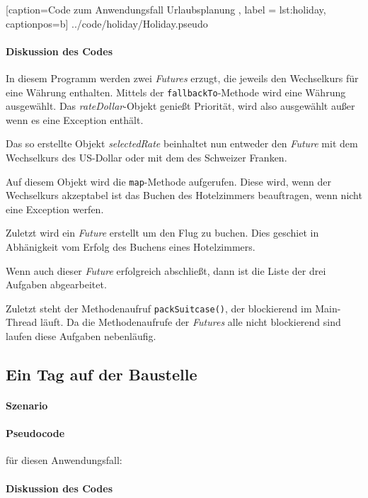 
    [caption={Code zum Anwendungsfall \glqq Urlaubsplanung\grqq{} },
       label = lst:holiday,
       captionpos=b]
 {../code/holiday/Holiday.pseudo}
 
\paragraph{Diskussion des Codes}

In diesem Programm werden zwei \emph{Futures} erzugt, die jeweils
den Wechselkurs für eine Währung enthalten. Mittels der
\texttt{fallbackTo}-Methode wird eine Währung ausgewählt.
Das \emph{rateDollar}-Objekt genießt Priorität, wird also ausgewählt
außer wenn es eine Exception enthält.

Das so erstellte Objekt \emph{selectedRate} beinhaltet nun entweder
den \emph{Future} mit dem Wechselkurs des US-Dollar oder mit dem des
Schweizer Franken.

Auf diesem Objekt wird die \texttt{map}-Methode aufgerufen. Diese wird,
wenn der Wechselkurs akzeptabel ist das Buchen des Hotelzimmers beauftragen,
wenn nicht eine Exception werfen.

Zuletzt wird ein \emph{Future} erstellt um den Flug zu buchen. Dies
geschiet in Abhänigkeit vom Erfolg des Buchens eines Hotelzimmers.

Wenn auch dieser \emph{Future} erfolgreich abschließt, dann ist die
Liste der drei Aufgaben abgearbeitet.

Zuletzt steht der Methodenaufruf \texttt{packSuitcase()}, der blockierend
im Main-Thread läuft. Da die Methodenaufrufe der \emph{Futures} alle
nicht blockierend sind laufen diese Aufgaben nebenläufig.

\subsection{Ein Tag auf der Baustelle}

\paragraph{Szenario}

\paragraph{Pseudocode} für diesen Anwendungsfall:

\paragraph{Diskussion des Codes}

